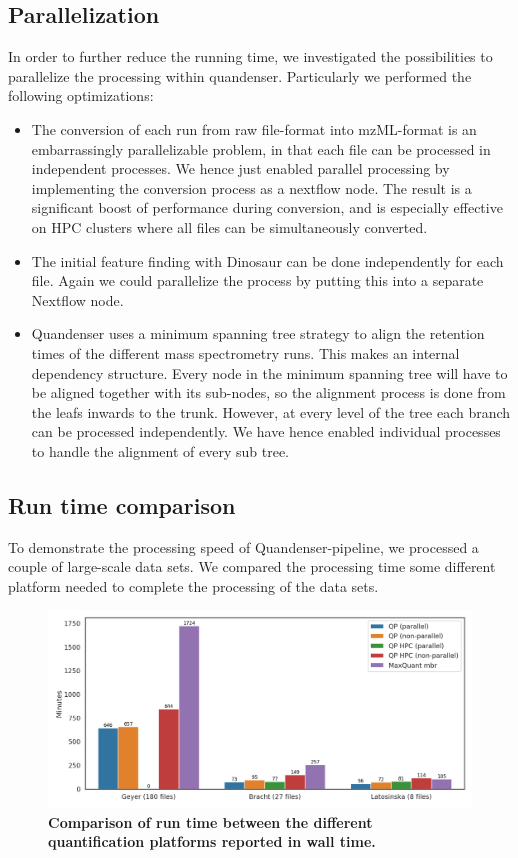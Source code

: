 \documentclass[11pt]{article}
\begin{document}
\subsection*{Parallelization}
In order to further reduce the running time, we investigated the possibilities to parallelize the processing within quandenser. Particularly we performed the following optimizations:
\begin{itemize}
  \item The conversion of each run from raw file-format into mzML-format is an embarrassingly parallelizable problem, in that each file can be processed in independent processes. We hence just enabled parallel processing by implementing the conversion process as a nextflow node. The result is a significant boost of performance during conversion, and is especially effective on HPC clusters where all files can be simultaneously converted.
  \item The initial feature finding with Dinosaur\cite{teleman2016dinosaur} can be done independently for each file. Again we could parallelize the process by putting this into a separate Nextflow node.
  \item Quandenser uses a minimum spanning tree strategy \cite{rost2016tric} to align the retention times of the different mass spectrometry runs. This makes an internal dependency structure. Every node in the minimum spanning tree will have to be aligned together with its sub-nodes, so the alignment process is done from the leafs inwards to the trunk.  However, at every level of the tree each branch can be processed independently. We have hence enabled individual processes to handle the alignment of every sub tree.
\end{itemize}

\subsection*{Run time comparison}
To demonstrate the processing speed of Quandenser-pipeline, we processed a couple of large-scale data sets. We compared the processing time some different platform needed to complete the processing of the data sets.

\begin{figure}[H]
  \includegraphics[width=\linewidth]{data/times.png}
  \caption{\textbf{Comparison of run time between the different quantification platforms reported in wall time.}}
  \label{fig:walltime}
\end{figure}
\end{document}
